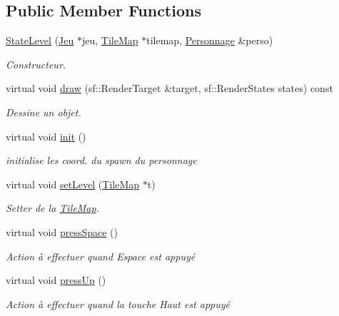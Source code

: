 \subsection*{Public Member Functions}
\begin{DoxyCompactItemize}
\item 
\hyperlink{class_state_level_a08ef66f8eb0ed452eaeb6cf80cae0b4a}{State\+Level} (\hyperlink{class_jeu}{Jeu} $\ast$jeu, \hyperlink{class_tile_map}{Tile\+Map} $\ast$tilemap, \hyperlink{class_personnage}{Personnage} \&perso)
\begin{DoxyCompactList}\small\item\em Constructeur. \end{DoxyCompactList}\item 
virtual void \hyperlink{class_state_level_a8e7ec8788b8c1992781fe135a5dc5f7d}{draw} (sf\+::\+Render\+Target \&target, sf\+::\+Render\+States states) const 
\begin{DoxyCompactList}\small\item\em Dessine un objet. \end{DoxyCompactList}\item 
virtual void \hyperlink{class_state_level_a901fd0b511f35b0af1b6e88ceedc6748}{init} ()
\begin{DoxyCompactList}\small\item\em initialise les coord. du spawn du personnage \end{DoxyCompactList}\item 
virtual void \hyperlink{class_state_level_aefa35ceeb1aa1b391392f38a71af4402}{set\+Level} (\hyperlink{class_tile_map}{Tile\+Map} $\ast$t)
\begin{DoxyCompactList}\small\item\em Setter de la \hyperlink{class_tile_map}{Tile\+Map}. \end{DoxyCompactList}\item 
virtual void \hyperlink{class_state_level_ab83986dcc97a8a923009b7c6a2aec6f6}{press\+Space} ()
\begin{DoxyCompactList}\small\item\em Action à effectuer quand Espace est appuyé \end{DoxyCompactList}\item 
virtual void \hyperlink{class_state_level_aa16ac397de41618dc276a4984ace536c}{press\+Up} ()
\begin{DoxyCompactList}\small\item\em Action à effectuer quand la touche Haut est appuyé \end{DoxyCompactList}\item 

\end{DoxyCompactItemize}
